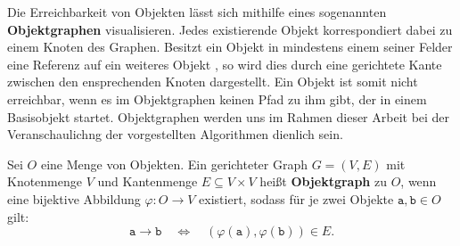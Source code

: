 Die Erreichbarkeit von Objekten lässt sich mithilfe eines sogenannten \textbf{Objektgraphen} visualisieren.
Jedes existierende Objekt korrespondiert dabei zu einem Knoten des Graphen.
Besitzt ein Objekt  in mindestens einem seiner Felder eine Referenz auf ein weiteres Objekt , so wird dies durch eine gerichtete Kante zwischen den ensprechenden Knoten dargestellt.
Ein Objekt ist somit nicht erreichbar, wenn es im Objektgraphen keinen Pfad zu ihm gibt, der in einem Basisobjekt startet.
Objektgraphen werden uns im Rahmen dieser Arbeit bei der Veranschaulichng der vorgestellten Algorithmen dienlich sein.

	
\begin{mybox}
\begin{defn}[Objektgraph]
	Sei $O$ eine Menge von Objekten.
	Ein gerichteter Graph $G = (V,E)$ mit Knotenmenge $V$ und Kantenmenge $E \subseteq V \times V$ heißt \textbf{Objektgraph} zu $O$, wenn eine bijektive Abbildung $\varphi \colon O \rightarrow V$ existiert, sodass für je zwei Objekte $\mathtt{a,b} \in O$ gilt:
	\[
		\mathtt{a} \rightarrow \mathtt{b} \quad \Leftrightarrow \quad (\varphi(\mathtt{a}),\varphi(\mathtt{b})) \in E.
	\]
\end{defn}
\end{mybox}



